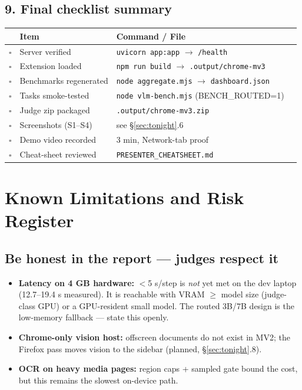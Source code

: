 \documentclass[11pt,a4paper]{article}
\newcommand{\code}[1]{\texttt{#1}}
\newcommand{\todo}{\textcolor{amber}{$\square$}}
\renewcommand{\arraystretch}{1.25}
\begin{document}
\begin{itemize}
\subsection{9. Final checklist summary}

\begin{table}[H]
\small
\renewcommand{\arraystretch}{1.3}
\begin{tabularx}{\linewidth}{@{}lllX@{}}
\toprule
 & \textbf{Item} & \textbf{Command / File} \\
\midrule
\todo & Server verified & \code{uvicorn app:app} $\rightarrow$ \code{/health} \\
\todo & Extension loaded & \code{npm run build} $\rightarrow$ \code{.output/chrome-mv3} \\
\todo & Benchmarks regenerated & \code{node aggregate.mjs} $\rightarrow$ \code{dashboard.json} \\
\todo & Tasks smoke-tested & \code{node vlm-bench.mjs} (BENCH\_ROUTED=1) \\
\todo & Judge zip packaged & \code{.output/chrome-mv3.zip} \\
\todo & Screenshots (S1--S4) & see \S\ref{sec:tonight}.6 \\
\todo & Demo video recorded & 3 min, Network-tab proof \\
\todo & Cheat-sheet reviewed & \code{PRESENTER\_CHEATSHEET.md} \\
\bottomrule
\end{tabularx}
\end{table}

\section{Known Limitations and Risk Register}

\subsection*{Be honest in the report --- judges respect it}

\begin{itemize}
\item \textbf{Latency on 4 GB hardware:} $<$5 s/step is \emph{not} yet met on the dev laptop (12.7--19.4 s measured). It is reachable with VRAM $\geq$ model size (judge-class GPU) or a GPU-resident small model. The routed 3B/7B design is the low-memory fallback --- state this openly.
\item \textbf{Chrome-only vision host:} offscreen documents do not exist in MV2; the Firefox pass moves vision to the sidebar (planned, \S\ref{sec:tonight}.8).
\item \textbf{OCR on heavy media pages:} region caps + sampled gate bound the cost, but this remains the slowest on-device path.
\end{itemize}


\end{itemize}
\end{document}
